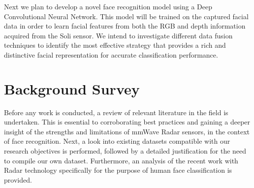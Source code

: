 \documentclass{interim}
\begin{document}
Next we plan to develop a novel face recognition model using a Deep Convolutional Neural Network. This model will be trained on the captured facial data in order to learn facial features from both the RGB and depth information acquired from the Soli sensor. We intend to investigate different data fusion techniques to identify the most effective strategy that provides a rich and distinctive facial representation for accurate classification performance. 




\section{Background Survey}
Before any work is conducted, a review of relevant literature in the field is undertaken. This is essential to corroborating best practices and gaining a deeper insight of the strengths and limitations of mmWave Radar sensors, in the context of face recognition. Next, a look into existing datasets compatible with our research objectives is performed, followed by a detailed justification for the need to compile our own dataset. Furthermore, an analysis of the recent work with Radar technology specifically for the purpose of human face classification is provided.
\end{document}

